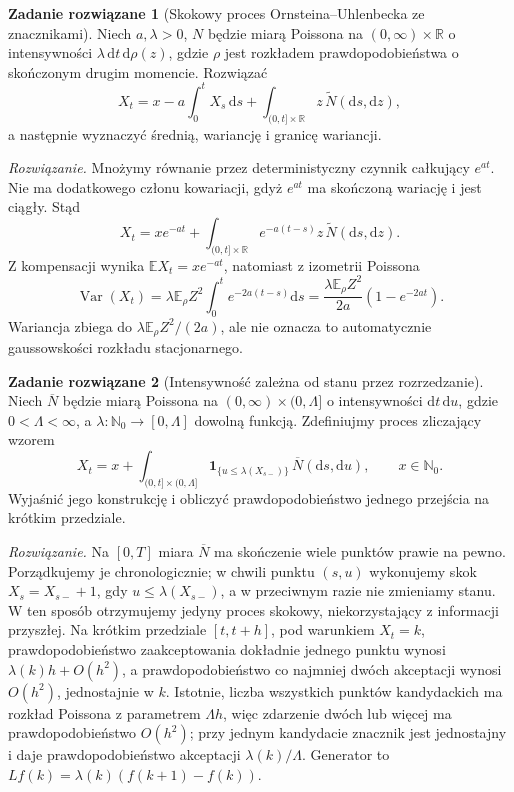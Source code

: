 \documentclass[11pt,a4paper,oneside]{report}
\numberwithin{equation}{chapter}
\theoremstyle{plain}
\theoremstyle{definition}
\newtheorem{zadanie}{Zadanie rozwiązane}[chapter]
\theoremstyle{remark}
\newcommand{\R}{\mathbb{R}}
\newcommand{\N}{\mathbb{N}}
\newcommand{\E}{\mathbb{E}}
\newcommand{\Var}{\operatorname{Var}}
\newcommand{\ind}[1]{\mathbf{1}_{#1}}
\newcommand{\dd}{\mathrm{d}}
\begin{document}
\begin{zadanie}[Skokowy proces Ornsteina--Uhlenbecka ze znacznikami]
Niech $a,\lambda>0$, $N$ będzie miarą Poissona na
$(0,\infty)\times\R$ o intensywności
$\lambda\,\dd t\,\dd\rho(z)$, gdzie $\rho$ jest
rozkładem prawdopodobieństwa o skończonym drugim momencie.
Rozwiązać
\[
 X_t=x-a\int_0^tX_s\,\dd s
 +\int_{(0,t]\times\R}z\,\widetilde N(\dd s,\dd z),
\]
a następnie wyznaczyć średnią, wariancję i granicę wariancji.

\emph{Rozwiązanie.} Mnożymy równanie przez deterministyczny
czynnik całkujący $e^{at}$. Nie ma dodatkowego członu
kowariacji, gdyż $e^{at}$ ma skończoną wariację i jest ciągły.
Stąd
\[
 X_t=xe^{-at}+\int_{(0,t]\times\R}
 e^{-a(t-s)}z\,\widetilde N(\dd s,\dd z).
\]
Z kompensacji wynika $\E X_t=xe^{-at}$, natomiast z
izometrii Poissona
\[
 \Var(X_t)=\lambda\E_\rho Z^2\int_0^te^{-2a(t-s)}\dd s
 =\frac{\lambda\E_\rho Z^2}{2a}(1-e^{-2at}).
\]
Wariancja zbiega do $\lambda\E_\rho Z^2/(2a)$, ale
nie oznacza to automatycznie gaussowskości rozkładu
stacjonarnego.
\end{zadanie}

\begin{zadanie}[Intensywność zależna od stanu przez rozrzedzanie]
Niech $\overline N$ będzie miarą Poissona na
$(0,\infty)\times(0,\Lambda]$ o intensywności
$\dd t\,\dd u$, gdzie $0<\Lambda<\infty$, a
$\lambda:\N_0\to[0,\Lambda]$ dowolną funkcją.
Zdefiniujmy proces zliczający wzorem
\[
 X_t=x+\int_{(0,t]\times(0,\Lambda]}
  \ind{\{u\le\lambda(X_{s-})\}}\,\overline N(\dd s,\dd u),
 \qquad x\in\N_0.
\]
Wyjaśnić jego konstrukcję i obliczyć prawdopodobieństwo
jednego przejścia na krótkim przedziale.

\emph{Rozwiązanie.} Na $[0,T]$ miara $\overline N$ ma
skończenie wiele punktów prawie na pewno. Porządkujemy
je chronologicznie; w chwili punktu $(s,u)$ wykonujemy skok
$X_s=X_{s-}+1$, gdy $u\le\lambda(X_{s-})$, a w przeciwnym
razie nie zmieniamy stanu. W ten sposób otrzymujemy
jedyny proces skokowy, niekorzystający z informacji przyszłej.
Na krótkim przedziale $[t,t+h]$, pod warunkiem $X_t=k$,
prawdopodobieństwo zaakceptowania dokładnie jednego punktu
wynosi $\lambda(k)h+O(h^2)$, a prawdopodobieństwo co najmniej
dwóch akceptacji wynosi $O(h^2)$, jednostajnie w $k$.
Istotnie, liczba wszystkich punktów kandydackich ma
rozkład Poissona z parametrem $\Lambda h$, więc zdarzenie
dwóch lub więcej ma prawdopodobieństwo $O(h^2)$; przy
jednym kandydacie znacznik jest jednostajny i daje
prawdopodobieństwo akceptacji $\lambda(k)/\Lambda$.
Generator to $Lf(k)=\lambda(k)(f(k+1)-f(k))$.
\end{zadanie}
\end{document}
